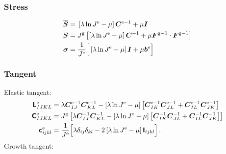 \documentclass[10pt,letterpaper,oneside]{report}
\newcommand{\ten}[1]{\mbox{\boldmath $#1$}{}}
\newcommand{\tenf}[1]{\mbox{{\sffamily{\bfseries {#1}}}}}
\newcommand{\scas}[1]{\mbox{{\scriptsize{${\rm{#1}}$}}}{}}
\begin{document}
\subsubsection{Stress}
\begin{align}
\overline{\ten{S}} ={}& \left[ \lambda \ln J^{\scas{e}} - \mu \right] \ten{C}^{\scas{e}-1} + \mu \ten{I} 
\\
\ten{S} ={}& J^{\scas{g}} \left[ \left[ \lambda \ln J^{\scas{e}} - \mu \right] \ten{C}^{-1} + \mu \ten{F}^{\scas{g}-1} \cdot \ten{F}^{\scas{g}-1} \right] 
\\
\ten{\sigma} ={}& \frac{1}{J^{\scas{e}}} \Big[ \left[ \lambda \ln J^{\scas{e}} - \mu \right] \ten{I} + \mu \ten{b}^{\scas{e}} \Big]
\end{align}

\subsubsection{Tangent}
Elastic tangent:
\begin{align}
\tenf{L}^{\scas{e}}_{IJKL} ={}& \lambda \ten{C}^{\scas{e}-1}_{IJ} \ten{C}^{\scas{e}-1}_{KL} - \left[ \lambda \ln J^{\scas{e}} - \mu \right] \left[ \ten{C}^{\scas{e}-1}_{IK} \ten{C}^{\scas{e}-1}_{JL} + \ten{C}^{\scas{e}-1}_{IL} \ten{C}^{\scas{e}-1}_{JK} \right] 
\\
\tenf{C}^{\scas{e}}_{IJKL} ={}& J^{\scas{g}} \left[ \lambda \ten{C}^{-1}_{IJ} \ten{C}^{-1}_{KL} - \left[ \lambda \ln J^{\scas{e}} - \mu \right] \left[ \ten{C}^{-1}_{IK} \ten{C}^{-1}_{JL} + \ten{C}^{-1}_{IL} \ten{C}^{-1}_{JK} \right] \right]  
\\
\tenf{c}^{\scas{e}}_{ijkl} ={}& \frac{1}{J^{\scas{e}}} \Big[ \lambda \delta_{ij} \delta_{kl} - 2 \left[ \lambda \ln J^{\scas{e}} - \mu \right] \tenf{I}_{ijkl} \Big] \, .
\end{align}
Growth tangent:
\end{document}
